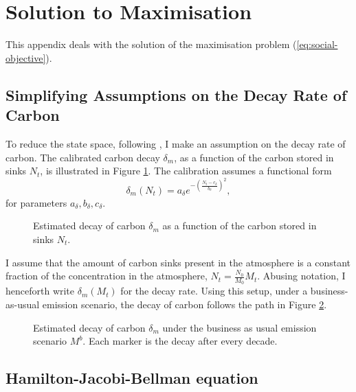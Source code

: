 \documentclass[../../main.tex]{subfiles}
\begin{document}
\section{Solution to Maximisation} \label{appendix:solution}

This appendix deals with the solution of the maximisation problem (\ref{eq:social-objective}).

\subsection{Simplifying Assumptions on the Decay Rate of Carbon} \label{appendix:assumptions}
 
To reduce the state space, following \cite{hambel_optimal_2021}, I make an assumption on the decay rate of carbon. The calibrated carbon decay $\delta_m$, as a function of the carbon stored in sinks $N_t$, is illustrated in Figure \ref{fig:decay}. The calibration assumes a functional form \begin{equation}
    \delta_m(N_t) = a_{\delta} e^{-\left(\frac{N_t - c_{\delta}}{b_{\delta}}\right)^2},
\end{equation} for parameters $a_{\delta}, b_{\delta}, c_{\delta}$.

\begin{figure}[htbp]
    \centering
    
    \caption{Estimated decay of carbon $\delta_m$ as a  function of the carbon stored in sinks $N_t$.}
    \label{fig:decay}
\end{figure}

I assume that the amount of carbon sinks present in the atmosphere is a constant fraction of the concentration in the atmosphere, $N_t = \frac{N_0}{M_0} M_t$. Abusing notation, I henceforth write $\delta_m(M_t)$ for the decay rate. Using this setup, under a business-as-usual emission scenario, the decay of carbon follows the path in Figure \ref{fig:decaypath}.

\begin{figure}[htbp]
    \centering
    
    \caption{Estimated decay of carbon $\delta_m$ under the business as usual emission scenario $M^{b}$. Each marker is the decay after every decade.}
    \label{fig:decaypath}
\end{figure}

\subsection{Hamilton-Jacobi-Bellman equation} 
\end{document}
